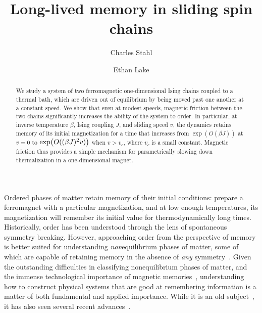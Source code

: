 \documentclass[prl,aps,twocolumn,groupedaddress,superscriptaddress,preprintnumbers,nobibnotes]{revtex4-2}
\begin{document}
	
	
	\title{Long-lived memory in sliding spin chains}
	\author{Charles Stahl} 
	\author{Ethan Lake}
	\begin{abstract}
		We study a system of two ferromagnetic one-dimensional Ising chains coupled to a thermal bath, which are driven out of equilibrium by being moved past one another at a constant speed. We show that even at modest speeds, magnetic friction between the two chains significantly increases the ability of the system to order. In particular, at inverse temperature $\beta$, Ising coupling $J$, and sliding speed $v$, the dynamics retains memory of its initial magnetization for a time that increases from $\exp(O(\beta J))$ at $v = 0$ to $\exp(O((\beta J)^2v))$ when $v>v_c$, where $v_c$ is a small constant. Magnetic friction thus provides a simple mechanism for parametrically slowing down thermalization in a one-dimensional magnet. 
	\end{abstract}
	
	\maketitle
	
	Ordered phases of matter retain memory of their initial conditions: prepare a ferromagnet with a particular magnetization, and at low enough temperatures, its magnetization will remember its initial value for thermodynamically long times. Historically, order has been understood through the lens of spontaneous symmetry breaking. However, approaching order from the perspective of memory is better suited for understanding {\it non}equilibrium phases of matter, some of which are capable of retaining memory in the absence of {\it any} symmetry~\cite{toom1974nonergodic,toom1980stable,gacs1978one,gacs2001reliable,cirel2006reliable}. Given the outstanding difficulties in classifying nonequilibrium phases of matter, and the immense technological importance of magnetic memories~\cite{tang2010magnetic}, understanding how to construct physical systems that are good at remembering information is a matter of both fundamental and applied importance. While it is an old subject~\cite{toom1974nonergodic,toom1980stable,gacs1978one,gacs2001reliable,cirel2006reliable}, it has also seen several recent advances~\cite{mordvintsev2020growing,pajouheshgar2026exploring,lake2025squeezing,stahl2026slow,stahl2026brownian}. 
	
\end{document}
